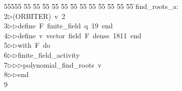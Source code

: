 %
%
\begin{tabbing}
55555 \= 55 \= 55 \= 55 \= 55 \= 55 \= 55 \= 55 \= 55 \= 55 \= 55 \= 55 \= 55 \= \>find\_roots\_a:\\[0pt]
2\>$\triangleright$\>(ORBITER)\ v\ 2\ \\[0pt]
3\>$\triangleright$\>$\triangleright$\>define\ F\ finite\_field\ q\ 19\ end\ \\[0pt]
4\>$\triangleright$\>$\triangleright$\>define\ v\ vector\ field\ F\ dense\ 1811\ end\ \\[0pt]
5\>$\triangleright$\>$\triangleright$\>with\ F\ do\ \\[0pt]
6\>$\triangleright$\>$\triangleright$\>finite\_field\_activity\ \\[0pt]
7\>$\triangleright$\>$\triangleright$\>$\triangleright$\>polynomial\_find\_roots\ v\ \\[0pt]
8\>$\triangleright$\>$\triangleright$\>end\\[0pt]
9\>\end{tabbing}
